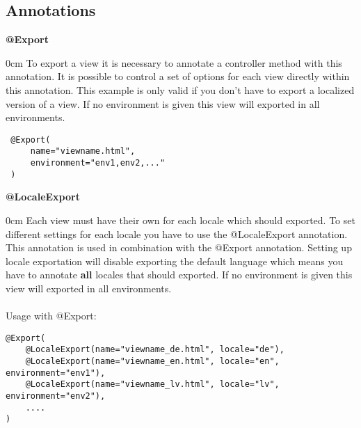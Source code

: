 \subsection{Annotations}

\noindent
\begin{minipage}{\textwidth}
\textbf{@Export}\\
\vspace{-1em}
\begin{adjustwidth}{\parindent}{0cm}
To export a view it is necessary to annotate a controller method with this annotation. It is possible to control a set of options for each view directly within this annotation. This example is only valid if you don't have to export a localized version of a view. If no environment is given this view will exported in all environments.

\begin{verbatim}
 @Export(
     name="viewname.html",
     environment="env1,env2,..."
 )
\end{verbatim}
\end{adjustwidth}
\vspace{1em}
\end{minipage}

\noindent
\begin{minipage}{\textwidth}
\textbf{@LocaleExport}\\
\vspace{-1em}
\begin{adjustwidth}{\parindent}{0cm}
Each view must have their own for each locale which should exported. To set different settings for each locale you have to use the @LocaleExport annotation. This annotation is used in combination with the @Export annotation. Setting up locale exportation will disable exporting the default language which means you have to annotate \textbf{all} locales that should exported. If no environment is given this view will exported in all environments. \\
\\
Usage with @Export:
\begin{verbatim}
@Export(
    @LocaleExport(name="viewname_de.html", locale="de"),
    @LocaleExport(name="viewname_en.html", locale="en", environment="env1"),
    @LocaleExport(name="viewname_lv.html", locale="lv", environment="env2"),
    ....
)
\end{verbatim}
\end{adjustwidth}
\vspace{1em}
\end{minipage}

